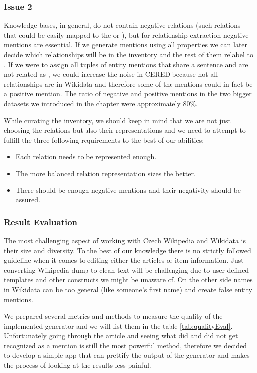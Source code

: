 \subsubsection{Issue 2}Knowledge bases, in general, do not contain negative relations (such relations that could be easily mapped to the  or ), but for relationship extraction negative mentions are essential. If we generate mentions using all properties we can later decide which relationships will be in the inventory and the rest of them relabel to . If we were to assign all tuples of entity mentions that share a sentence and are not related as , we could increase the noise in CERED because not all relationships are in Wikidata and therefore some of the  mentions could in fact be a positive mention. The ratio of negative and positive mentions in the two bigger datasets we introduced in the  chapter were approximately 80\%.

While curating the inventory, we should keep in mind that we are not just choosing the relations but also their representations and we need to attempt to fulfill the three following requirements to the best of our abilities:
\begin{itemize}
\item Each relation needs to be represented enough.
\item The more balanced relation representation sizes the better.
\item There should be enough negative mentions and their negativity should be assured. 

\end{itemize}

\subsubsection{Result Evaluation}
The most challenging aspect of working with Czech Wikipedia and Wikidata is their size and diversity. To the best of our knowledge there is no strictly followed guideline when it comes to editing either the articles or item information. Just converting Wikipedia dump to clean text will be challenging due to user defined templates and other constructs we might be unaware of. On the other side names in Wikidata can be too general (like someone's first name) and create false entity mentions. 

We prepared several metrics and methods to measure the quality of the implemented generator and we will list them in the table \ref{tab:qualityEval}. Unfortunately going through the article and seeing what did and did not get recognized as a mention is still the most powerful method, therefore we decided to develop a simple app that can prettify the output of the generator and makes the process of looking at the results less painful.  


